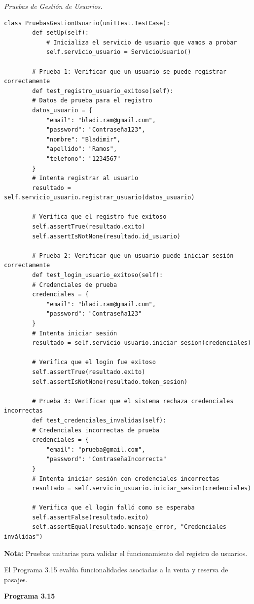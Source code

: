 	\textit{Pruebas de Gestión de Usuarios.} %
	\vspace{0.3cm} %
	\begin{lstlisting}[lineskip=-1pt]
		class PruebasGestionUsuario(unittest.TestCase):
		def setUp(self):
			# Inicializa el servicio de usuario que vamos a probar
			self.servicio_usuario = ServicioUsuario()
		
		# Prueba 1: Verificar que un usuario se puede registrar correctamente
		def test_registro_usuario_exitoso(self):
		# Datos de prueba para el registro
		datos_usuario = {
			"email": "bladi.ram@gmail.com",
			"password": "Contraseña123",
			"nombre": "Bladimir",
			"apellido": "Ramos",
			"telefono": "1234567"
		}
		# Intenta registrar al usuario
		resultado = self.servicio_usuario.registrar_usuario(datos_usuario)
		
		# Verifica que el registro fue exitoso
		self.assertTrue(resultado.exito)  
		self.assertIsNotNone(resultado.id_usuario)
		
		# Prueba 2: Verificar que un usuario puede iniciar sesión correctamente
		def test_login_usuario_exitoso(self):
		# Credenciales de prueba
		credenciales = {
			"email": "bladi.ram@gmail.com",
			"password": "Contraseña123"
		}
		# Intenta iniciar sesión
		resultado = self.servicio_usuario.iniciar_sesion(credenciales)
		
		# Verifica que el login fue exitoso
		self.assertTrue(resultado.exito)  
		self.assertIsNotNone(resultado.token_sesion)  
		
		# Prueba 3: Verificar que el sistema rechaza credenciales incorrectas
		def test_credenciales_invalidas(self):
		# Credenciales incorrectas de prueba
		credenciales = {
			"email": "prueba@gmail.com",
			"password": "ContraseñaIncorrecta"
		}
		# Intenta iniciar sesión con credenciales incorrectas
		resultado = self.servicio_usuario.iniciar_sesion(credenciales)
		
		# Verifica que el login falló como se esperaba
		self.assertFalse(resultado.exito)  
		self.assertEqual(resultado.mensaje_error, "Credenciales inválidas")  
	\end{lstlisting}
	
	\textbf{Nota:} Pruebas unitarias para validar el funcionamiento del registro de usuarios.
	
	El Programa 3.15 evalúa funcionalidades asociadas a la venta y reserva de pasajes. 		
	
	\textbf{Programa 3.15}
	
